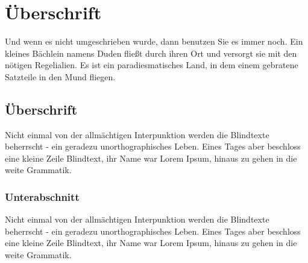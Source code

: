 \documentclass[%
	12pt,%
	a4paper,%
	oneside,%
 liststotoc, idxtotoc, bibtotoc, %
	halfparskip,%
	nochapterprefix,%
	appendixprefix, %
smallheadings,%
]{scrreprt}
\begin{document}
%
%

\section{Überschrift}
Und wenn es nicht umgeschrieben wurde, dann benutzen Sie es immer noch. Ein kleines Bächlein namens Duden fließt durch ihren Ort und versorgt sie mit den nötigen Regelialien. Es ist ein paradiesmatisches Land, in dem einem gebratene Satzteile in den Mund fliegen. 

\subsection{Überschrift}
Nicht einmal von der allmächtigen Interpunktion werden die Blindtexte beherrscht - ein geradezu unorthographisches Leben. Eines Tages aber beschloss eine kleine Zeile Blindtext, ihr Name war Lorem Ipsum, hinaus zu gehen in die weite Grammatik.

\subsubsection{Unterabschnitt}
Nicht einmal von der allmächtigen Interpunktion werden die Blindtexte beherrscht - ein geradezu unorthographisches Leben. Eines Tages aber beschloss eine kleine Zeile Blindtext, ihr Name war Lorem Ipsum, hinaus zu gehen in die weite Grammatik.
\end{document}
